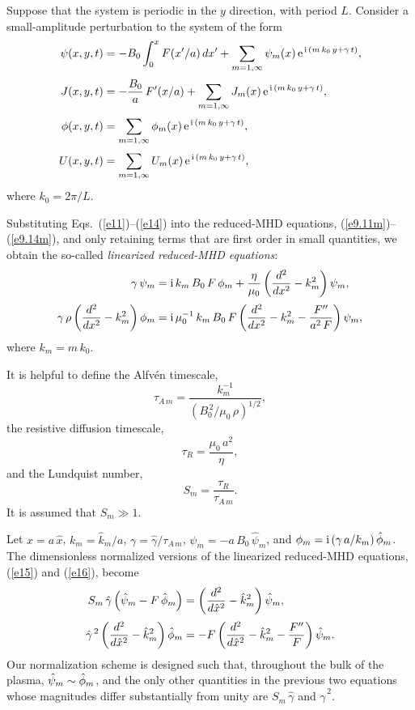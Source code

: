 \documentclass[12pt,prb,aps]{revtex4-1}
\begin{document}
Suppose that the system is periodic in the $y$ direction, with period $L$. Consider a small-amplitude perturbation to the system of the
form
\begin{align}\label{e11}
\psi(x,y,t) &= -B_0\int_0^xF(x'/a)\,dx' + \sum_{m=1,\infty}\psi_m(x)\,{\rm e}^{\,{\rm i}\,(m\,k_0\,y+\gamma\,t)},\\[0.5ex]
J(x,y,t) &= -\frac{B_0}{a}\,F'(x/a)+ \sum_{m=1,\infty}J_m(x)\,{\rm e}^{\,{\rm i}\,(m\,k_0\,y+\gamma\,t)},\\[0.5ex]
\phi(x,y,t) &=  \sum_{m=1,\infty}\phi_m(x)\,{\rm e}^{\,{\rm i}\,(m\,k_0\,y+\gamma\,t)},\\[0.5ex]
U(x,y,t) &=  \sum_{m=1,\infty}U_m(x)\,{\rm e}^{\,{\rm i}\,(m\,k_0\,y+\gamma\,t)},\label{e14}
\end{align}
where $k_0=2\pi/L$. 

Substituting Eqs.~(\ref{e11})--(\ref{e14}) into the reduced-MHD equations, (\ref{e9.11m})--(\ref{e9.14m}), and
only retaining terms that are first order in small quantities, we obtain the so-called {\em linearized reduced-MHD equations}: 
\begin{align}
\gamma\,\psi_m &= {\rm i}\,k_m\,B_0\,F\,\phi_m +\frac{\eta}{\mu_0}\left(\frac{d^2}{dx^2}-k_m^{2}\right)\psi_m,\label{e15}
\\[0.5ex]
\gamma\,\rho\left(\frac{d^2}{dx^2}-k_m^{2}\right)\phi_m &= {\rm i}\,\mu_0^{-1}\,k_m\,B_0\,F\left(\frac{d^2}{dx^2}
-k_m^{2}-\frac{F''}{a^2\,F}\right)\psi_m,\label{e16}
\end{align}
where $k_m= m\,k_0$. 

It is helpful to define the Alfv\'{e}n timescale,
\begin{equation}
\tau_{A\,m} = \frac{k_m^{-1}}{(B_0^{\,2}/\mu_0\,\rho)^{1/2}},
\end{equation}
the resistive diffusion timescale,
\begin{equation}
\tau_R = \frac{\mu_0\,a^2}{\eta},
\end{equation}
and the Lundquist number,
\begin{equation}
S_m = \frac{\tau_R}{\tau_{A\,m}}.
\end{equation}
It is assumed that $S_m\gg 1$. 

Let $x=a\,\hat{x}$, $k_m = \hat{k}_m/a$, $\gamma=\hat{\gamma}/\tau_{A\,m}$, $\psi_m = -a\,B_0\,\hat{\psi}_m$,
and $\phi_m= {\rm i}\,(\gamma\,a/k_m)\,\skew{3}\hat{\phi}_m$. The dimensionless normalized versions of the
linearized reduced-MHD equations, (\ref{e15}) and (\ref{e16}),  become
\begin{align}
S_m\,\hat{\gamma}\left(\hat{\psi}_m-F\,\skew{3}\hat{\phi}_m\right)&= \left(\frac{d^2}{d\hat{x}^2}-\hat{k}_m^2\right)\hat{\psi}_m,\label{e9.27}\\[0.5ex]
\hat{\gamma}^{\,2}\left(\frac{d^2}{d\hat{x}^2}-\hat{k}_m^2\right)\skew{3}\hat{\phi}_m&= - F\left(\frac{d^2}{d\hat{x}^2}
-\hat{k}_m^2-\frac{F''}{F}\right)\hat{\psi}_m.\label{e9.28}
\end{align}
 Our normalization scheme is designed such that, throughout the
bulk of the plasma, $\hat{\psi}_m\sim \skew{3}\hat{\phi}_m$, and the only other quantities in the previous two equations whose magnitudes differ substantially
from unity are $S_m\,\hat{\gamma}$ and $\hat{\gamma}^{\,2}$. 
\end{document}
